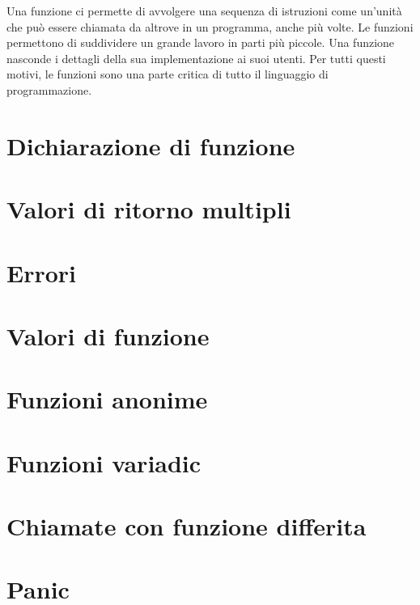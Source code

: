 Una funzione ci permette di avvolgere una sequenza di istruzioni come un'unità che può essere chiamata da altrove in un programma, anche più volte.
Le funzioni permettono di suddividere un grande lavoro in parti più piccole.
Una funzione nasconde i dettagli della sua implementazione ai suoi utenti.
Per tutti questi motivi, le funzioni sono una parte critica di tutto il linguaggio di programmazione.


\section{Dichiarazione di funzione}
\label{sec:dichiarazione_di_funzione}%



\section{Valori di ritorno multipli}
\label{sec:valori_di_ritorno_multipli}%



\section{Errori}
\label{sec:errori}%



\section{Valori di funzione}
\label{sec:valori_di_funzione}%



\section{Funzioni anonime}
\label{sec:funzioni_anonime}%



\section{Funzioni variadic}
\label{sec:funzioni_variadic}%



\section{Chiamate con funzione differita}
\label{sec:chiamate_con_funzione_differita}%



\section{Panic}
\label{sec:panic}%


